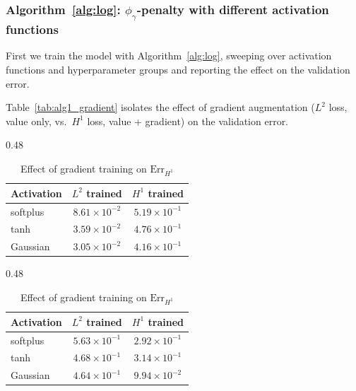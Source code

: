 \documentclass[11pt]{amsart}
\theoremstyle{definition}
\theoremstyle{remark}
\begin{document}
\subsubsection{Algorithm~\ref{alg:log}: $\phi_{\gamma}$-penalty with different activation functions}

First we train the model with Algorithm~\ref{alg:log}, sweeping over activation functions and hyperparameter groups and reporting the effect on the validation error. 

Table~\ref{tab:alg1_gradient} isolates the effect of gradient augmentation ($L^2$ loss, value only, vs.\ $H^1$ loss, value + gradient) on the validation error. 

\begin{table}[htbp]
\centering
\caption{Effect of gradient training on validation error ($\alpha = 10^{-5}$, $\gamma = 1$).}
\label{tab:alg1_gradient}
\begin{subtable}{0.48\textwidth}
\centering
\setlength{\tabcolsep}{9pt}
\renewcommand{\arraystretch}{1.25}
\begin{tabular}{lcc}
\toprule
Activation & $L^2$ trained & $H^1$ trained \\
\midrule
softplus & $8.61 \times 10^{-2}$ & $5.19 \times 10^{-1}$ \\
tanh & $3.59 \times 10^{-2}$ & $4.76 \times 10^{-1}$ \\
Gaussian & $3.05 \times 10^{-2}$ & $4.16 \times 10^{-1}$ \\
\bottomrule
\end{tabular}
\caption{Effect of gradient training on $\mathrm{Err}_{L^2}$ }
\label{tab:alg1_gradient_errl2}
\end{subtable}
\hfill
\begin{subtable}{0.48\textwidth}
\centering
\setlength{\tabcolsep}{9pt}
\renewcommand{\arraystretch}{1.25}
\begin{tabular}{lcc}
\toprule
Activation & $L^2$ trained & $H^1$ trained \\
\midrule
softplus & $5.63 \times 10^{-1}$ & $2.92 \times 10^{-1}$ \\
tanh & $4.68 \times 10^{-1}$ & $3.14 \times 10^{-1}$ \\
Gaussian & $4.64 \times 10^{-1}$ & $9.94 \times 10^{-2}$ \\
\bottomrule
\end{tabular}
\caption{Effect of gradient training on $\mathrm{Err}_{H^1}$}
\label{tab:alg1_gradient_errh1}
\end{subtable}
\end{table}
\end{document}
